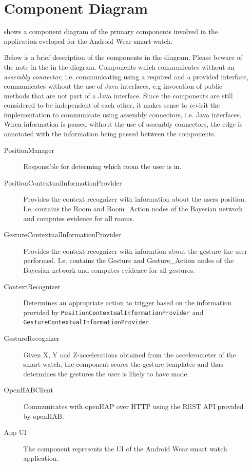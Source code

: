 \section{Component Diagram}
\label{sec:implementation:component-diagram}

 shows a component diagram of the primary components involved in the application eveloped for the Android Wear smart watch.

Below is a brief description of the components in the diagram. Please beware of the note in the in the diagram. Components which communicates without an \emph{assembly connector}, i.e. communicating using a required and a provided interface, communicates without the use of Java interfaces, e.g invocation of public methods that are not part of a Java interface. Since the components are still considered to be independent of each other, it makes sense to revisit the implementation to communicate using assembly connectors, i.e. Java interfaces. When information is passed without the use of assembly connectors, the edge is annotated with the information being passed between the components.

\begin{description}
\item[PositionManager] Responsible for determing which room the user is in.
\item[PositionContextualInformationProvider] Provides the context recognizer with information about the users position. I.e. contains the Room and Room\_Action nodes of the Bayesian network and computes evidence for all rooms.
\item[GestureContextualInformationProvider] Provides the context recognizer with informtion about the gesture the user performed. I.e. contains the Gesture and Gesture\_Action nodes of the Bayesian network and computes evidence for all gestures.
\item[ContextRecognizer] Determines an appropriate action to trigger based on the information provided by \texttt{PositionContextualInformationProvider} and \texttt{GestureContextualInformationProvider}.
\item[GestureRecognizer] Given X, Y and Z-accelerations obtained from the accelerometer of the smart watch, the component scores the gesture templates and thus determines the gestures the user is likely to have made.
\item[OpenHABClient] Communicates with openHAP over HTTP using the REST API provided by openHAB.
\item[App UI] The component represents the UI of the Android Wear smart watch application.
\end{description}

